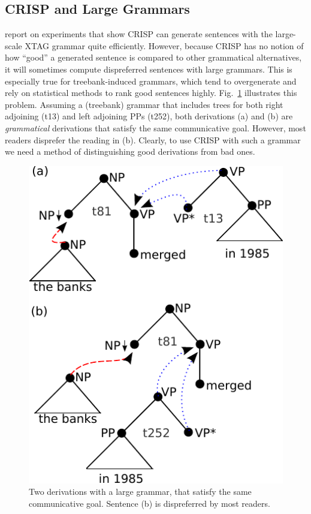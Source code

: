 \subsection{CRISP and Large Grammars}

 report on experiments that show CRISP can generate sentences with the large-scale XTAG grammar \cite{xtag2001} quite efficiently.  However, because CRISP has no notion of how ``good'' a generated sentence is compared to other grammatical alternatives, it will sometimes compute dispreferred sentences with large grammars.  This is especially true for treebank-induced grammars, which tend to overgenerate and rely on statistical methods to rank good sentences highly.  Fig.~\ref{fig:overgen} illustrates this problem.  Assuming a (treebank) grammar that includes trees for both right adjoining (t13) and left adjoining PPs (t252), both derivations (a) and (b) are {\it grammatical} derivations that satisfy the same communicative goal. However, most readers disprefer the reading in (b).  Clearly, to use CRISP with such a grammar we need a method of distinguishing good derivations from bad ones. 


\begin{figure}
\begin{center}
\includegraphics[width=.3\textwidth]{figures/overgen.pdf}
\caption{\label{fig:overgen} Two derivations with a large grammar, that satisfy the same communicative goal. Sentence (b) is dispreferred by most readers.}
\end{center}
\end{figure} 


